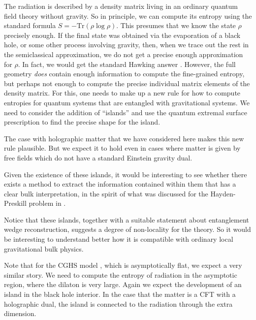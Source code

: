 \documentclass[11pt]{article}
\begin{document}
The radiation is described by a density matrix living in an ordinary quantum field theory without gravity. 
So in principle, we can compute its entropy using the standard formula $S = - \text{Tr}(\rho \log \rho)$. 
This presumes that we know the state $\rho$ precisely enough. 
If the final state was obtained via the evaporation of a black hole, or some other process involving gravity, then, when we trace out the rest in the semiclassical approximation, we do not get a precise enough approximation for $\rho$. 
In fact, we would get the standard Hawking answer \cite{Hawking:1976ra}. 
However, the full geometry {\it does} contain enough information to compute the fine-grained entropy, but perhaps not enough to compute the precise individual matrix elements of the density matrix. 
For this, one needs to make up a new rule for how to compute entropies for quantum systems that are entangled with gravitational systems. 
We need to consider the addition of ``islands'' and use the quantum extremal surface prescription  \cite{Ryu:2006bv,Hubeny:2007xt,Engelhardt:2014gca} to find the precise shape for the island. 
 
The case with holographic matter that we have considered here makes this new rule plausible. 
But we expect it to hold even in cases where matter is given by free fields which do not have a standard Einstein gravity dual. 

Given the existence of these islands, it would be interesting to see whether there exists a method   to extract the information contained within them that has a clear bulk interpretation, in the spirit of what was discussed for the Hayden-Preskill problem \cite{Hayden:2007cs} in \cite{Gao:2016bin,Maldacena:2017axo}.

Notice that these  islands, together with a suitable statement about entanglement wedge reconstruction, suggests a degree of non-locality for the theory. So it would be interesting to understand better how it is compatible with ordinary local gravitational bulk physics.

Note that for the CGHS model 
\cite{Callan:1992rs,Russo:1992ht,Russo:1992ax,Strominger:1994tn, Fiola:1994ir}, which is asymptotically flat,  we expect a very similar story. We need to compute the entropy of radiation in the asymptotic region, where the dilaton is very large. Again we expect the development of an island in the black hole interior. In the case that the matter is a CFT with a holographic dual, the island is connected to the radiation through the extra dimension. 
\end{document}
